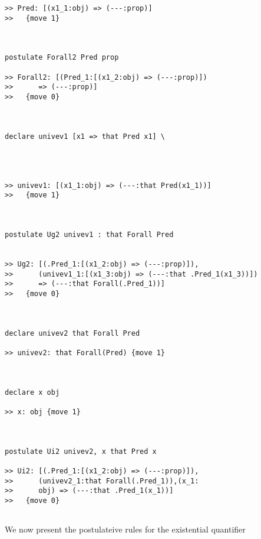 \documentclass{article}
\begin{document}
\begin{verbatim}
>> Pred: [(x1_1:obj) => (---:prop)]
>>   {move 1}



postulate Forall2 Pred prop

>> Forall2: [(Pred_1:[(x1_2:obj) => (---:prop)])
>>      => (---:prop)]
>>   {move 0}



declare univev1 [x1 => that Pred x1] \
   



>> univev1: [(x1_1:obj) => (---:that Pred(x1_1))]
>>   {move 1}



postulate Ug2 univev1 : that Forall Pred


>> Ug2: [(.Pred_1:[(x1_2:obj) => (---:prop)]),
>>      (univev1_1:[(x1_3:obj) => (---:that .Pred_1(x1_3))])
>>      => (---:that Forall(.Pred_1))]
>>   {move 0}



declare univev2 that Forall Pred

>> univev2: that Forall(Pred) {move 1}



declare x obj

>> x: obj {move 1}



postulate Ui2 univev2, x that Pred x

>> Ui2: [(.Pred_1:[(x1_2:obj) => (---:prop)]),
>>      (univev2_1:that Forall(.Pred_1)),(x_1:
>>      obj) => (---:that .Pred_1(x_1))]
>>   {move 0}


\end{verbatim}

We now present the postulateive rules for the existential quantifier
\end{document}
